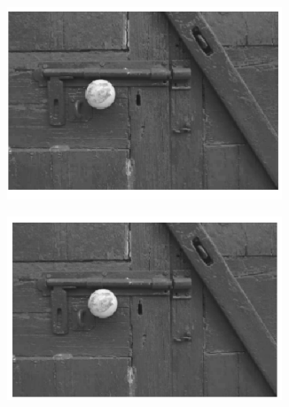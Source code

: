 \documentclass{article}
\begin{document}
\begin{figure}[H]
    \begin{subfigure}{0.5\textwidth}
        \includegraphics[width=0.9\textwidth]{puertita10-1.png} 
    \end{subfigure}\hfill
    \begin{subfigure}{0.5\textwidth}
        \includegraphics[width=0.9\textwidth]{puertita10-200.png} 
    \end{subfigure}
\end{figure}
\end{document}
